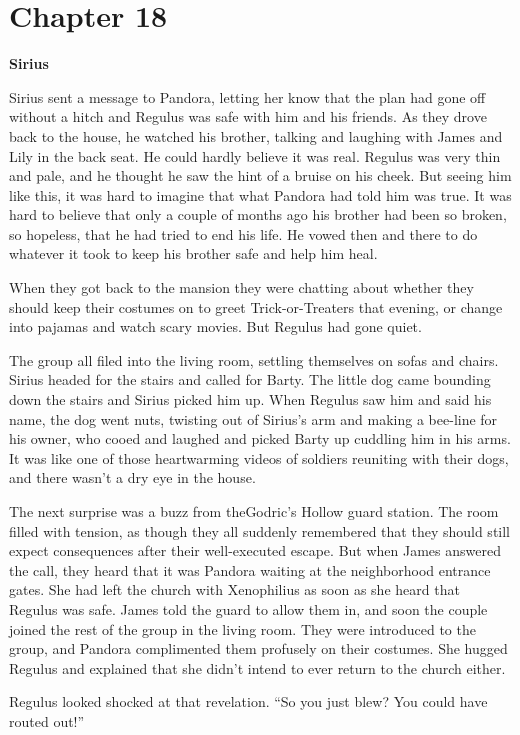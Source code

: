 \documentclass[12pt,twoside,openright]{memoir}
\begin{document}
\chapter*{Chapter 18}

\textbf{Sirius} 

Sirius sent a message to Pandora, letting her know that the plan had gone off without a hitch and Regulus was safe with him and his friends. As they drove back to the house, he watched his brother, talking and laughing with James and Lily in the back seat. He could hardly believe it was real. Regulus was very thin and pale, and he thought he saw the hint of a bruise on his cheek. But seeing him like this, it was hard to imagine that what Pandora had told him was true. It was hard to believe that only a couple of months ago his brother had been so broken, so hopeless, that he had tried to end his life. He vowed then and there to do whatever it took to keep his brother safe and help him heal.

When they got back to the mansion they were chatting about whether they should keep their costumes on to greet Trick-or-Treaters that evening, or change into pajamas and watch scary movies. But Regulus had gone quiet. 

The group all filed into the living room, settling themselves on sofas and chairs. Sirius headed for the stairs and called for Barty. The little dog came bounding down the stairs and Sirius picked him up. When Regulus saw him and said his name, the dog went nuts, twisting out of Sirius's arm and making a bee-line for his owner, who cooed and laughed and picked Barty up cuddling him in his arms. It was like one of those heartwarming videos of soldiers reuniting with their dogs, and there wasn't a dry eye in the house.

The next surprise was a buzz from theGodric's Hollow guard station. The room filled with tension, as though they all suddenly remembered that they should still expect consequences after their well-executed escape. But when James answered the call, they heard that it was Pandora waiting at the neighborhood entrance gates. She had left the church with Xenophilius as soon as she heard that Regulus was safe. James told the guard to allow them in, and soon the couple joined the rest of the group in the living room. They were introduced to the group, and Pandora complimented them profusely on their costumes. She hugged Regulus and explained that she didn't intend to ever return to the church either.

Regulus looked shocked at that revelation. ``So you just blew? You could have routed out!''
\end{document}
